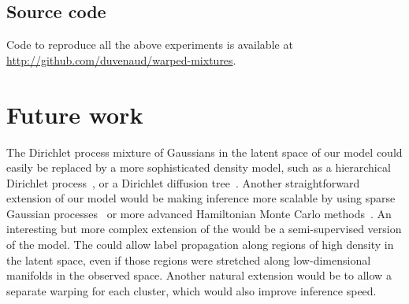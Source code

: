 \subsection{Source code}
Code to reproduce all the above experiments is available at \url{http://github.com/duvenaud/warped-mixtures}.



\section{Future work}

The Dirichlet process mixture of Gaussians in the latent space of our model could easily be replaced by a more sophisticated density model, such as a hierarchical Dirichlet process~\citep{teh2006hierarchical}, or a Dirichlet diffusion tree~\citep{neal2003density}.
Another straightforward extension of our model would be making inference more scalable by using sparse Gaussian processes~\citep{quinonero2005unifying,snelson2006sparse} or more advanced Hamiltonian Monte Carlo methods~\citep{zhang2011quasi}.
An interesting but more complex extension of the \iwmm{} would be a semi-supervised version of the model.
The \iwmm{} could allow label propagation along regions of high density in the latent space, even if those regions were stretched along low-dimensional manifolds in the observed space.  Another natural extension would be to allow a separate warping for each cluster, which would also improve inference speed.




%
%

